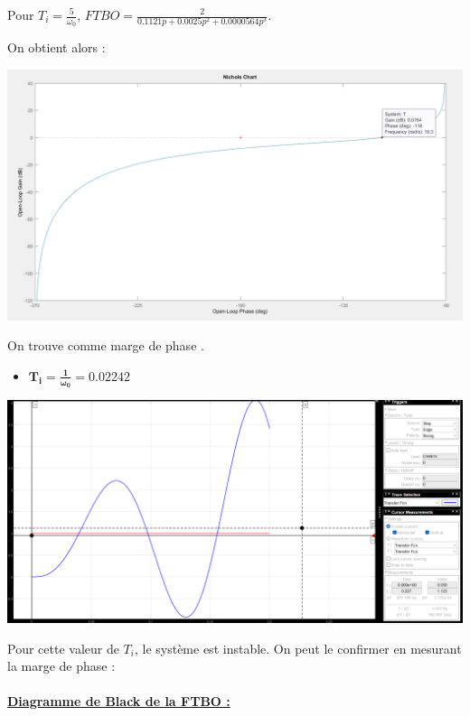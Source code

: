 \documentclass[12pt]{article}
\begin{document}
\begin{center}
    \normalsize Pour $T_i = \frac{5}{\omega_0}$, \large $FTBO = \frac{2}{0.1121p + 0.0025p^2 + 0.0000564p^3}$.
\end{center}
\normalsize On obtient alors :
\begin{center}
    \includegraphics[width = 16 cm]{TP2 Simulink/Syst_2/nichols_4.2_Ti=5_sur_omega0.png}
\end{center}
On trouve comme marge de phase .
\newpage
\begin{itemize}
    \item \large $\mathbf{T_i = \frac{1}{\omega_0} = 0.02242}$
\end{itemize}
\begin{center}
    \includegraphics[width = 16 cm]{TP2 Simulink/Syst_2/4.2_instable_Ti=1_sur_omega0.png}


\end{center}
Pour cette valeur de $T_i$, le système est instable. On peut le confirmer en mesurant la marge de phase :
\\\\\underline{\bf Diagramme de Black de la FTBO :}
\end{document}
